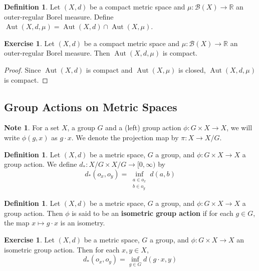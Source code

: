 \documentclass[12pt]{amsart}
\theoremstyle{definition}
\newtheorem{defn}[definition]{Definition}
\newtheorem{note}[definition]{Note}
\newtheorem{ex}[definition]{Exercise}
\newcommand{\R}{\mathbb{R}}
\newcommand{\MB}{\mathcal{B}}
\newcommand{\Rg}{[0,\infty)}
\DeclareMathOperator{\Aut}{Aut}
\newcommand{\lex}[1]{\label{ex:#1}}
\newcommand{\ld}[1]{\label{defn:#1}}
\begin{document}
	\begin{defn} \ld{}
	Let $(X,d)$ be a compact metric space and $\mu: \MB(X) \rightarrow \R$ an outer-regular Borel measure. Define $\Aut(X, d, \mu) = \Aut(X, d) \cap \Aut(X, \mu)$.
	\end{defn}
	
	\begin{ex} \lex{}
	Let $(X,d)$ be a compact metric space and $\mu: \MB(X) \rightarrow \R$ an outer-regular Borel measure. Then $\Aut(X, d, \mu)$ is compact.
	\end{ex}
	
	\begin{proof}
	Since $\Aut(X, d)$ is compact and $\Aut(X, \mu)$ is closed, $\Aut(X, d, \mu)$ is compact.
	\end{proof}
	
	
	
	
	
	
	
	
	
	
	
	\newpage
	\subsection{Group Actions on Metric Spaces}
	
	\begin{note}
	For a set $X$, a group $G$ and a (left) group action $\phi: G \times X \rightarrow X$, we will write $\phi(g, x)$ as $g \cdot x$. We denote the projection map by $\pi: X \rightarrow X/G$.
	\end{note}	
	
	\begin{defn} \ld{}
	Let $(X, d)$ be a metric space, $G$ a group, and $\phi: G \times X \rightarrow X$ a group action. We define 
	$d_*: X/G \times X / G \rightarrow \Rg$ by 
	$$d_*(o_x, o_y) = \inf_{\substack{a \in o_x \\ b \in o_y}} d(a,b) $$
	\end{defn}
	
	\begin{defn} \ld{}
	Let $(X, d)$ be a metric space, $G$ a group, and $\phi: G \times X \rightarrow X$ a group action. Then $\phi$ is said to be an \textbf{isometric group action} if for each $g \in G$, the map $x \mapsto g \cdot x$ is an isometry. 
	\end{defn}
	
	\begin{ex} \lex{}
	Let $(X, d)$ be a metric space, $G$ a group, and $\phi: G \times X \rightarrow X$ an isometric group action. Then for each $x, y \in X$, $$d_*(o_x, o_y) = \inf_{g \in G} d(g \cdot x, y)$$
	\end{ex}
	
\end{document}
